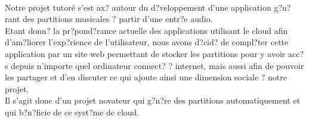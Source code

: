 \paragraph{}
Notre projet tutoré s'est ax? autour du d?veloppement d'une application g?n?rant des partitions musicales ? partir d'une entr?e audio. \\
Etant donn? la pr?pond?rance actuelle des applications utilisant le cloud afin d'am?liorer l'exp?rience de l'utilisateur, nous avons d?cid? de compl?ter cette application par un site web permettant de stocker les partitions pour y avoir acc?s depuis n'importe quel ordinateur connect? ? internet, mais aussi afin de pouvoir les partager et d'en discuter ce qui ajoute ainsi une dimension sociale ? notre projet. \\
Il s'agit donc d'un projet novateur qui g?n?re des partitions automatiquement et qui b?n?ficie de ce  syst?me de cloud.